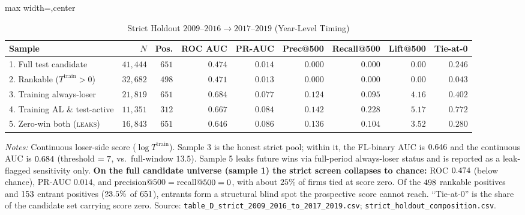 \begin{table}[htbp]
\centering
\caption{Strict Holdout $2009$--$2016 \to 2017$--$2019$ (Year-Level Timing)}
\label{tab:strict_holdout_submission}
\scriptsize
\begin{adjustbox}{max width=\textwidth,center}
\begin{threeparttable}
\begin{tabular}{lrrrrrrrr}
\toprule
Sample & $N$ & Pos. & ROC AUC & PR-AUC & Prec@500 & Recall@500 & Lift@500 & Tie-at-0 \\
\midrule
1. Full test candidate & $41{,}444$ & $651$ & $0.474$ & $0.014$ & $0.000$ & $0.000$ & $0.00$ & $0.246$ \\
2. Rankable ($T^{\text{train}}{>}0$) & $32{,}682$ & $498$ & $0.471$ & $0.013$ & $0.000$ & $0.000$ & $0.00$ & $0.043$ \\
3. Training always-loser & $21{,}819$ & $651$ & $0.684$ & $0.077$ & $0.124$ & $0.095$ & $4.16$ & $0.402$ \\
4. Training AL \& test-active & $11{,}351$ & $312$ & $0.667$ & $0.084$ & $0.142$ & $0.228$ & $5.17$ & $0.772$ \\
5. Zero-win both (\textsc{leaks}) & $16{,}843$ & $651$ & $0.646$ & $0.086$ & $0.136$ & $0.104$ & $3.52$ & $0.280$ \\
\bottomrule
\end{tabular}
\begin{tablenotes}
\scriptsize
\item \textit{Notes:} Continuous loser-side score
($\log T^{\text{train}}$). Sample 3 is the honest strict pool;
within it, the FL-binary AUC is $0.646$ and the
continuous AUC is $0.684$ (threshold
$=7$, vs.\ full-window $13.5$). Sample 5 leaks
future wins via full-period always-loser status and is reported as
a leak-flagged sensitivity only. \textbf{On the full candidate
universe (sample 1) the strict screen collapses to chance:} ROC
$0.474$ (below chance), PR-AUC $0.014$, and
precision@$500=$recall@$500=0$, with about $25\%$ of
firms tied at score zero. Of the $498$ rankable
positives and $153$ entrant positives
($23.5\%$ of $651$), entrants form a
structural blind spot the prospective score cannot reach. ``Tie-at-0''
is the share of the candidate set carrying score zero. Source:
\texttt{table\_D\_strict\_2009\_2016\_to\_2017\_2019.csv};
\texttt{strict\_holdout\_composition.csv}.
\end{tablenotes}
\end{threeparttable}
\end{adjustbox}
\end{table}


